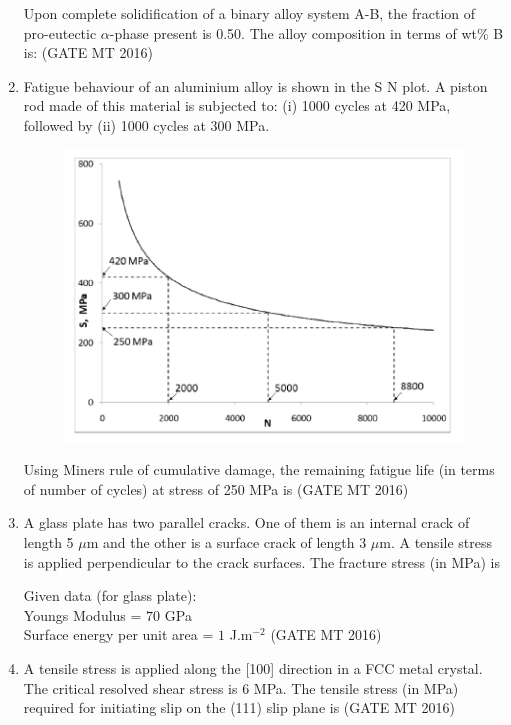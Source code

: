 \documentclass[journal, 11pt, onecolumn]{IEEEtran}
\theoremstyle{remark}
\begin{document}
\begin{enumerate}
Upon complete solidification of a binary alloy system A-B, the fraction of pro-eutectic $\alpha$-phase present is 0.50. The alloy composition in terms of wt\% B is:
\hfill(GATE MT 2016)

\item Fatigue behaviour of an aluminium alloy is shown in the S N plot. A piston rod made of this material is subjected to:  
(i) 1000 cycles at 420 MPa, followed by  
(ii) 1000 cycles at 300 MPa.  
\begin{figure}[H]
    \centering
    \includegraphics[width=1\linewidth]{figs/a6f7.png}
    \caption{}
    \label{fig:placeholder}
\end{figure}

Using Miner\textquotesingle s rule of cumulative damage, the remaining fatigue life (in terms of number of cycles) at stress of 250 MPa is
\hfill(GATE MT 2016)

\item A glass plate has two parallel cracks. One of them is an internal crack of length 5 $\mu$m and the other is a surface crack of length 3 $\mu$m. A tensile stress is applied perpendicular to the crack surfaces. The fracture stress (in MPa) is  

\noindent Given data (for glass plate):\\  
Young\textquotesingle s Modulus = $70$ GPa \\ 
Surface energy per unit area = $1$ J.m$^{-2}$  
\hfill(GATE MT 2016)

\item A tensile stress is applied along the [100] direction in a FCC metal crystal. The critical resolved shear stress is 6 MPa. The tensile stress (in MPa) required for initiating slip on the (111) slip plane is
\hfill(GATE MT 2016)


\end{enumerate}
\end{document}
